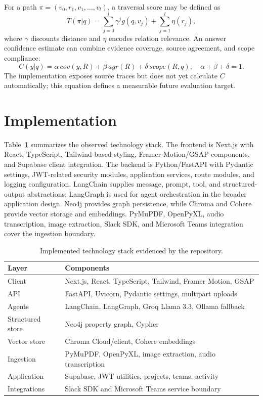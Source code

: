 \documentclass[conference]{IEEEtran}
\begin{document}
For a path $\pi=(v_0,r_1,v_1,\ldots,v_l)$, a traversal score may be defined as
\begin{equation}
 T(\pi|q)=\sum_{j=0}^{l}\gamma^j g(q,v_j)+\sum_{j=1}^{l}\eta(r_j),
\end{equation}
where $\gamma$ discounts distance and $\eta$ encodes relation relevance. An answer confidence estimate can combine evidence coverage, source agreement, and scope compliance:
\begin{equation}
 C(y|q)=\alpha\,cov(y,R)+\beta\,agr(R)+\delta\,scope(R,q),\quad \alpha+\beta+\delta=1.
\end{equation}
The implementation exposes source traces but does not yet calculate $C$ automatically; this equation defines a measurable future evaluation target.

\section{Implementation}
Table~\ref{tab:stack} summarizes the observed technology stack. The frontend is Next.js with React, TypeScript, Tailwind-based styling, Framer Motion/GSAP components, and Supabase client integration. The backend is Python/FastAPI with Pydantic settings, JWT-related security modules, application services, route modules, and logging configuration. LangChain supplies message, prompt, tool, and structured-output abstractions; LangGraph is used for agent orchestration in the broader application design. Neo4j provides graph persistence, while Chroma and Cohere provide vector storage and embeddings. PyMuPDF, OpenPyXL, audio transcription, image extraction, Slack SDK, and Microsoft Teams integration cover the ingestion boundary.

\begin{table}[t]
\caption{Implemented technology stack evidenced by the repository.}
\label{tab:stack}
\centering\small
\begin{tabular}{p{1.7cm}p{4.7cm}}
\toprule
Layer & Components\\
\midrule
Client & Next.js, React, TypeScript, Tailwind, Framer Motion, GSAP\\
API & FastAPI, Uvicorn, Pydantic settings, multipart uploads\\
Agents & LangChain, LangGraph, Groq Llama 3.3, Ollama fallback\\
Structured store & Neo4j property graph, Cypher\\
Vector store & Chroma Cloud/client, Cohere embeddings\\
Ingestion & PyMuPDF, OpenPyXL, image extraction, audio transcription\\
Application & Supabase, JWT utilities, projects, teams, activity\\
Integrations & Slack SDK and Microsoft Teams service boundary\\
\bottomrule
\end{tabular}
\end{table}
\end{document}
